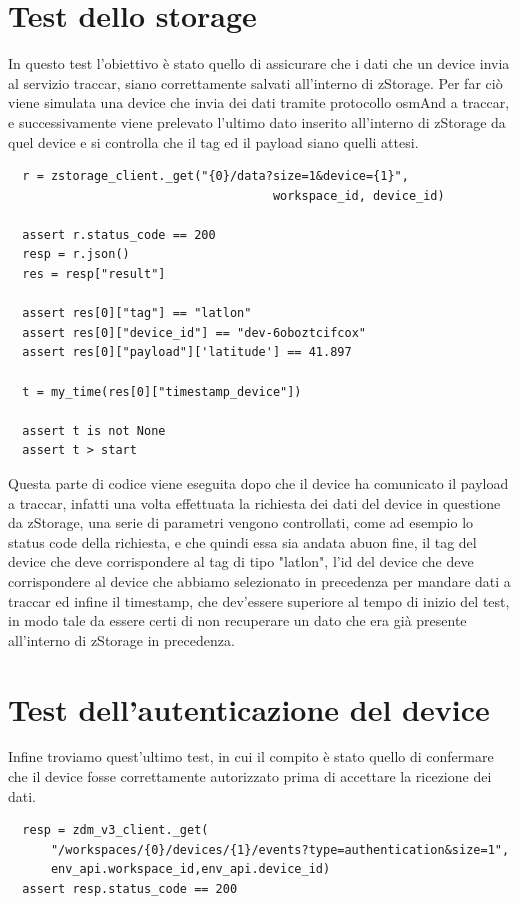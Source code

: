 \documentclass[a4paper,titlepage,12pt]{book}
\begin{document}
\section{\sffamily
Test dello storage}
In questo test l'obiettivo è stato quello di assicurare che i dati che un device invia al servizio traccar, siano correttamente salvati all'interno di zStorage. Per far ciò viene simulata una device che invia dei dati tramite protocollo osmAnd a traccar, e successivamente viene prelevato l'ultimo dato inserito all'interno di zStorage da quel device e si controlla che il tag ed il payload siano quelli attesi.


\begin{verbatim}
  r = zstorage_client._get("{0}/data?size=1&device={1}",
                                     workspace_id, device_id)  
   
  assert r.status_code == 200
  resp = r.json()       
  res = resp["result"]

  assert res[0]["tag"] == "latlon"
  assert res[0]["device_id"] == "dev-6oboztcifcox"
  assert res[0]["payload"]['latitude'] == 41.897

  t = my_time(res[0]["timestamp_device"])
  
  assert t is not None
  assert t > start 
\end{verbatim}


\noindent Questa parte di codice viene eseguita dopo che il device ha comunicato il payload a traccar, infatti una volta effettuata la richiesta dei dati del device in questione da zStorage, una serie di parametri vengono controllati, come ad esempio lo status code della richiesta, e che quindi essa sia andata abuon fine, il tag del device che deve corrispondere al tag di tipo "latlon", l'id del device che deve corrispondere al device che abbiamo selezionato in precedenza per mandare dati a traccar ed infine il timestamp, che dev'essere superiore al tempo di inizio del test, in modo tale da essere certi di non recuperare un dato che era già presente all'interno di zStorage in precedenza.

\section{\sffamily
Test dell'autenticazione del device}
Infine troviamo quest'ultimo test, in cui il compito è stato quello di confermare che il device fosse correttamente autorizzato prima di accettare la ricezione dei dati.

\begin{verbatim}
  resp = zdm_v3_client._get(
      "/workspaces/{0}/devices/{1}/events?type=authentication&size=1",           
      env_api.workspace_id,env_api.device_id)
  assert resp.status_code == 200
\end{verbatim}
\end{document}
